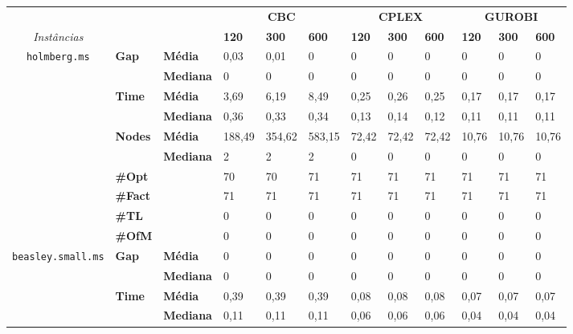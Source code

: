
	\begin{footnotesize}	
	\caption{}
	\label{cflp:tab:6}
	\begin{tabular}{c@{\hskip 0.2cm}l@{\hskip 0.1cm}l|lll|lll|lll}
	& & & \multicolumn{3}{c}{\textbf{CBC}} & \multicolumn{3}{c}{\textbf{CPLEX}} & \multicolumn{3}{c}{\textbf{GUROBI}} 	\\\textit{Instâncias} & & & \textbf{120} & \textbf{300} & \textbf{600} & \textbf{120} & \textbf{300} & \textbf{600} & \textbf{120} & \textbf{300} & \textbf{600} \\
\hline
\multirow{7}{*}{\texttt{holmberg.ms}} & \multirow{2}{*}{\textbf{Gap}} & \textbf{Média} & 0,03 & 0,01 & 0 & 0 & 0 & 0 & 0 & 0 & 0 \\
 & & \textbf{Mediana} & 0 & 0 & 0 & 0 & 0 & 0 & 0 & 0 & 0 \\
\cline{2-12}
 & \multirow{2}{*}{\textbf{Time}} & \textbf{Média} & 3,69 & 6,19 & 8,49 & 0,25 & 0,26 & 0,25 & 0,17 & 0,17 & 0,17 \\
 & & \textbf{Mediana} & 0,36 & 0,33 & 0,34 & 0,13 & 0,14 & 0,12 & 0,11 & 0,11 & 0,11 \\
\cline{2-12}
 & \multirow{2}{*}{\textbf{Nodes}} & \textbf{Média} & 188,49 & 354,62 & 583,15 & 72,42 & 72,42 & 72,42 & 10,76 & 10,76 & 10,76 \\
 & & \textbf{Mediana} & 2 & 2 & 2 & 0 & 0 & 0 & 0 & 0 & 0 \\
\cline{2-12}
 & \textbf{\#Opt} & & 70 & 70 & 71 & 71 & 71 & 71 & 71 & 71 & 71 \\
 & \textbf{\#Fact} & & 71 & 71 & 71 & 71 & 71 & 71 & 71 & 71 & 71 \\
 & \textbf{\#TL} & & 0 & 0 & 0 & 0 & 0 & 0 & 0 & 0 & 0 \\
 & \textbf{\#OfM} & & 0 & 0 & 0 & 0 & 0 & 0 & 0 & 0 & 0 \\
\hline
\multirow{7}{*}{\texttt{beasley.small.ms}} & \multirow{2}{*}{\textbf{Gap}} & \textbf{Média} & 0 & 0 & 0 & 0 & 0 & 0 & 0 & 0 & 0 \\
 & & \textbf{Mediana} & 0 & 0 & 0 & 0 & 0 & 0 & 0 & 0 & 0 \\
\cline{2-12}
 & \multirow{2}{*}{\textbf{Time}} & \textbf{Média} & 0,39 & 0,39 & 0,39 & 0,08 & 0,08 & 0,08 & 0,07 & 0,07 & 0,07 \\
 & & \textbf{Mediana} & 0,11 & 0,11 & 0,11 & 0,06 & 0,06 & 0,06 & 0,04 & 0,04 & 0,04 \\

\end{tabular}
\end{footnotesize}
